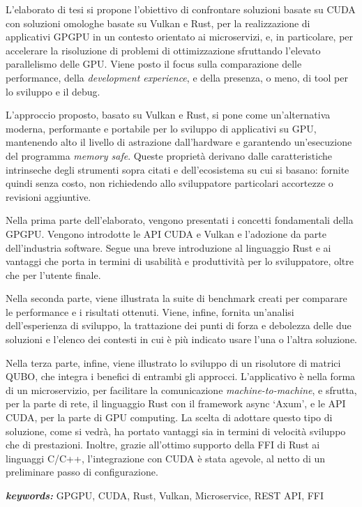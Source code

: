 
L'elaborato di tesi si propone l'obiettivo di confrontare soluzioni basate su \gls{CUDA} con soluzioni omologhe basate su Vulkan e Rust, per la realizzazione di applicativi \gls{GPGPU} in un contesto orientato ai microservizi, e, in particolare, per accelerare la risoluzione di problemi di ottimizzazione sfruttando l'elevato parallelismo delle GPU. Viene posto il focus sulla comparazione delle performance, della \textit{development experience}, e della presenza, o meno, di tool per lo sviluppo e il debug.

L'approccio proposto, basato su Vulkan e Rust, si pone come un'alternativa moderna, performante e portabile per lo sviluppo di applicativi su GPU, mantenendo alto il livello di astrazione dall'hardware e garantendo un'esecuzione del programma \textit{memory safe}. Queste proprietà derivano dalle caratteristiche intrinseche degli strumenti sopra citati e dell'ecosistema su cui si basano: fornite quindi senza costo, non richiedendo allo sviluppatore particolari accortezze o revisioni aggiuntive.

Nella prima parte dell'elaborato, vengono presentati i concetti fondamentali della \gls{GPGPU}. Vengono introdotte le \gls{API} \gls{CUDA} e Vulkan e l'adozione da parte dell'industria software. Segue una breve introduzione al linguaggio Rust e ai vantaggi che porta in termini di usabilità e produttività per lo sviluppatore, oltre che per l'utente finale.

Nella seconda parte, viene illustrata la suite di benchmark creati per comparare le performance e i risultati ottenuti. Viene, infine, fornita un'analisi dell'esperienza di sviluppo, la trattazione dei punti di forza e debolezza delle due soluzioni e l'elenco dei contesti in cui è più indicato usare l'una o l'altra soluzione.

Nella terza parte, infine, viene illustrato lo sviluppo di un risolutore di matrici QUBO, che integra i benefici di entrambi gli approcci. L'applicativo è nella forma di un microservizio, per facilitare la comunicazione \textit{machine-to-machine}, e sfrutta, per la parte di rete, il linguaggio Rust con il framework async `Axum', e le \gls{API} \gls{CUDA}, per la parte di \gls{GPU} computing. La scelta di adottare questo tipo di soluzione, come si vedrà, ha portato vantaggi sia in termini di velocità sviluppo che di prestazioni. Inoltre, grazie all'ottimo supporto della \gls{FFI} di Rust ai linguaggi C/C++, l'integrazione con \gls{CUDA} è stata agevole, al netto di un preliminare passo di configurazione.

\bigskip

\textit{\textbf{keywords:}} GPGPU, CUDA, Rust, Vulkan, Microservice, REST API, FFI
